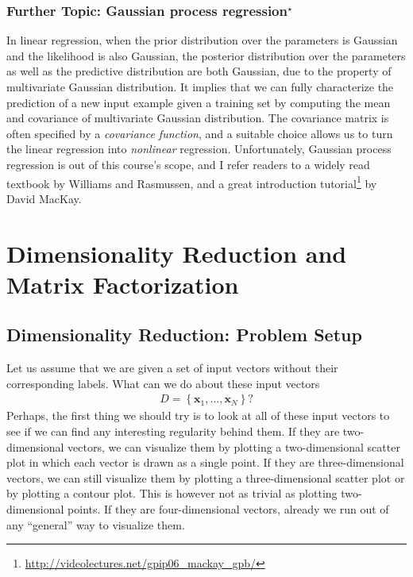 \documentclass{report}
\newcommand{\vect}[1]{\mathbf{#1}}
\newcommand{\vx}[0]{\vect{x}}
\begin{document}
\subsection{Further Topic: Gaussian process regression$^\star$}

In linear regression, when the prior distribution over the parameters is
Gaussian and the likelihood is also Gaussian, the posterior distribution over
the parameters as well as the predictive distribution are both Gaussian, due to
the property of multivariate Gaussian distribution. It implies that we can fully
characterize the prediction of a new input example given a training set by
computing the mean and covariance of multivariate Gaussian distribution. The
covariance matrix is often specified by a {\it covariance function}, and a
suitable choice allows us to turn the linear regression into {\it nonlinear}
regression. Unfortunately, Gaussian process regression is out of this course's
scope, and I refer readers to a widely read textbook \cite{williams2006gaussian}
by Williams and Rasmussen, and a great introduction tutorial\footnote{
    \url{http://videolectures.net/gpip06_mackay_gpb/}
}
by David MacKay.





\chapter{Dimensionality Reduction and Matrix Factorization}
\label{chap:dimred}


\section{Dimensionality Reduction: Problem Setup}
\label{sec:dimred}

Let us assume that we are given a set of input vectors without their
corresponding labels. What can we do about these input vectors 
\begin{align*}
    D=\left\{
    \vx_1, \ldots, \vx_N
\right\}?
\end{align*}
Perhaps, the first thing we should try is to look at all of these input vectors
to see if we can find any interesting regularity behind them. If they are
two-dimensional vectors, we can visualize them by plotting a two-dimensional
scatter plot in which each vector is drawn as a single point. If they are
three-dimensional vectors, we can still visualize them by plotting a
three-dimensional scatter plot or by plotting a contour plot. This is however
not as trivial as plotting two-dimensional points. If they are four-dimensional
vectors, already we run out of any ``general'' way to visualize them.
\end{document}
